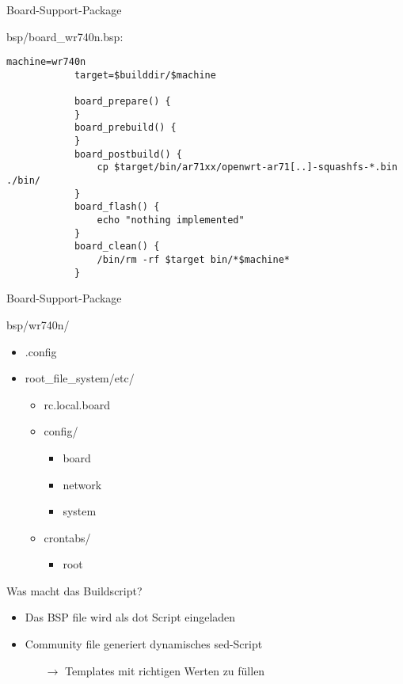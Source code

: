 \begin{frame}[fragile]{Board-Support-Package}
    \begin{block}{bsp/board\_wr740n.bsp:}
        \scriptsize
        \begin{lstlisting}[gobble=12]
            machine=wr740n
            target=$builddir/$machine

            board_prepare() {
            }
            board_prebuild() {
            }
            board_postbuild() {
                cp $target/bin/ar71xx/openwrt-ar71[..]-squashfs-*.bin ./bin/
            }
            board_flash() {
                echo "nothing implemented"
            }
            board_clean() {
                /bin/rm -rf $target bin/*$machine*
            }
        \end{lstlisting}
    \end{block}
\end{frame}

\begin{frame}{Board-Support-Package}
    \begin{block}{bsp/wr740n/}
        \begin{itemize}
            \item .config
            \item root\_file\_system/etc/
            \begin{itemize}
                \item rc.local.board
                \item config/
                \begin{itemize}
                    \item board
                    \item network
                    \item system
                \end{itemize}
                \item crontabs/
                \begin{itemize}
                    \item root
                \end{itemize}
            \end{itemize}
        \end{itemize}
    \end{block}
\end{frame}

\begin{frame}{Was macht das Buildscript?}
    \begin{itemize}
        \item Das BSP file wird als dot Script eingeladen
        \item Community file generiert dynamisches sed-Script
        \begin{itemize}
            \item[$\rightarrow$] Templates mit richtigen Werten zu füllen
        \end{itemize}
    \end{itemize}
\end{frame}

